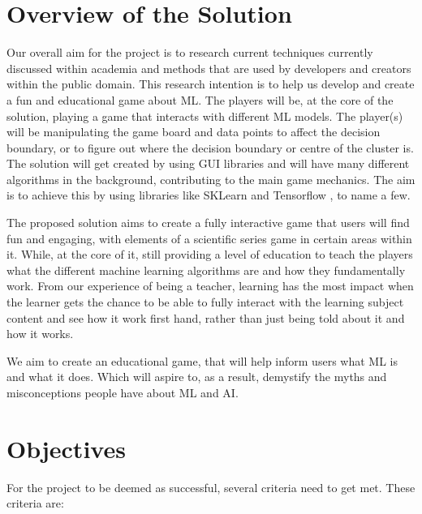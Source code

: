 	\section{Overview of the Solution}
		\label{sec:overview_of_solution}
		Our overall aim for the project is to research current techniques currently discussed within academia and methods that are used by developers and creators within the public domain. This research intention is to help us develop and create a fun and educational game about ML. The players will be, at the core of the solution, playing a game that interacts with different ML models. The player(s) will be manipulating the game board and data points to affect the decision boundary, or to figure out where the decision boundary or centre of the cluster is. The solution will get created by using  GUI libraries and will have many different algorithms in the background, contributing to the main game mechanics. The aim is to achieve this by using libraries like SKLearn \cite{sklearn_api} and Tensorflow \cite{tensorflow2015-whitepaper}, to name a few.
		
		The proposed solution aims to create a fully interactive game that users will find fun and engaging, with elements of a scientific series game in certain areas within it. While, at the core of it, still providing a level of education to teach the players what the different machine learning algorithms are and how they fundamentally work. From our experience of being a teacher, learning has the most impact when the learner gets the chance to be able to fully interact with the learning subject content and see how it work first hand, rather than just being told about it and how it works. 
		
		We aim to create an educational game, that will help inform users what ML is and what it does. Which will aspire to, as a result, demystify the myths and misconceptions people have about ML and AI.
		
	
	\section{Objectives}
	
	For the project to be deemed as successful, several criteria need to get met. These criteria are:
	
